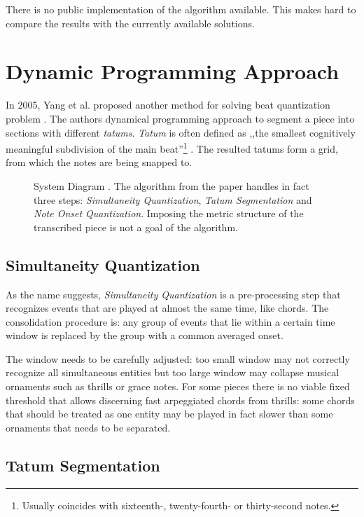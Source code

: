 There is no public implementation of the algorithm available. This makes hard to compare the results with the currently available solutions.

\section{Dynamic Programming Approach}

In 2005, Yang et al. proposed another method for solving beat quantization problem \cite{Yang2005}. The authors dynamical programming approach to segment a piece into sections with different \emph{tatums}. \emph{Tatum} is often defined as ,,the smallest cognitively meaningful
subdivision of the main beat''\footnote{Usually coincides with sixteenth-, twenty-fourth- or thirty-second notes.} \cite{Iyer1997}. The resulted tatums form a grid, from which the notes are being snapped to.

\begin{figure}[!ht]
\centering

\caption[System Diagram]{System Diagram \cite{Yang2005}. The algorithm from the paper handles in fact three steps: \emph{Simultaneity Quantization}, \emph{Tatum Segmentation} and \emph{Note Onset Quantization}. Imposing the metric structure of the transcribed piece is not a goal of the algorithm.}
\end{figure}

\subsection{Simultaneity Quantization}

As the name suggests, \emph{Simultaneity Quantization} is a pre-processing step that recognizes events that are played at almost the same time, like chords. The consolidation procedure is: any group of events that lie within a certain time window is replaced by the group with a common averaged onset. 

The window needs to be carefully adjusted: too small window may not correctly recognize all simultaneous entities but too large window may collapse musical ornaments such as thrills or grace notes. For some pieces there is no viable fixed threshold that allows discerning fast arpeggiated chords from thrills: some chords that should be treated as one entity may be played in fact slower than some ornaments that needs to be separated.

\subsection{Tatum Segmentation}

